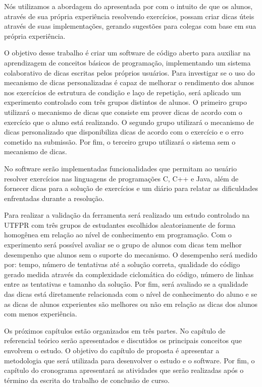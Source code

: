 	Nós utilizamos a abordagem do  apresentada por  com o intuito de que os alunos, através de sua própria experiência resolvendo exercícios, possam criar dicas úteis através de suas implementações, gerando sugestões para colegas com base em sua própria experiência.
	
	O objetivo desse trabalho é criar um software de código aberto para auxiliar na aprendizagem de conceitos básicos de programação, implementando um sistema colaborativo de dicas escritas pelos próprios usuários. Para investigar se o uso do mecanismo de dicas personalizadas é capaz de melhorar o rendimento dos alunos nos exercícios de estrutura de condição e laço de repetição, será aplicado um experimento controlado com três grupos distintos de alunos. O primeiro grupo utilizará o mecanismo de dicas que consiste em prover dicas de acordo com o exercício que o aluno está realizando. O segundo grupo utilizará o mecanismo de dicas personalizado que disponibiliza dicas de acordo com o exercício e o erro cometido na submissão. Por fim, o terceiro grupo utilizará o sistema sem o mecanismo de dicas.
	
	No software serão implementadas funcionalidades que permitam ao usuário resolver exercícios nas linguagens de programações C, C++ e Java, além de fornecer dicas para a solução de exercícios e um diário para relatar as dificuldades enfrentadas durante a resolução.
	
	Para realizar a validação da ferramenta será realizado um estudo controlado na UTFPR com três grupos de estudantes escolhidos aleatoriamente de forma homogênea em relação ao nível de conhecimento em programação. Com o experimento será possível avaliar se o grupo de alunos com dicas tem melhor desempenho que alunos sem o suporte do mecanismo. O desempenho será medido por: tempo, número de tentativas até a solução correta, qualidade do código gerado medida através da complexidade ciclomática do código, número de linhas entre as tentativas e tamanho da solução. Por fim, será avaliado se a qualidade das dicas está diretamente relacionada com o nível de conhecimento do aluno e se as dicas de alunos experientes são melhores ou não em relação as dicas dos alunos com menos experiência.
	
	Os próximos capítulos estão organizados em três partes. No capítulo de referencial teórico serão apresentados e discutidos os principais conceitos que envolvem o estudo. O objetivo do capítulo de proposta é apresentar a metodologia que será utilizada para desenvolver o estudo e o software. Por fim, o capítulo do cronograma apresentará as atividades que serão realizadas após o término da escrita do trabalho de conclusão de curso.
